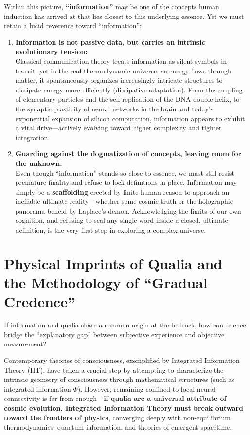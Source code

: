 \documentclass[11pt,a4paper]{article}
\begin{document}
Within this picture, \textbf{``information''} may be one of the concepts human induction has arrived at that lies closest to this underlying essence. Yet we must retain a lucid reverence toward ``information'':

\begin{enumerate}[leftmargin=1.8em, itemsep=0.5em]
    \item \textbf{Information is not passive data, but carries an intrinsic evolutionary tension:}\\
    Classical communication theory treats information as silent symbols in transit, yet in the real thermodynamic universe, as energy flows through matter, it spontaneously organizes increasingly intricate structures to dissipate energy more efficiently (dissipative adaptation). From the coupling of elementary particles and the self-replication of the DNA double helix, to the synaptic plasticity of neural networks in the brain and today's exponential expansion of silicon computation, information appears to exhibit a vital drive---actively evolving toward higher complexity and tighter integration.

    \item \textbf{Guarding against the dogmatization of concepts, leaving room for the unknown:}\\
    Even though ``information'' stands so close to essence, we must still resist premature finality and refuse to lock definitions in place. Information may simply be a \textbf{scaffolding} erected by finite human reason to approach an ineffable ultimate reality---whether some cosmic truth or the holographic panorama beheld by Laplace's demon. Acknowledging the limits of our own cognition, and refusing to seal any single word inside a closed, ultimate definition, is the very first step in exploring a complex universe.
\end{enumerate}

\section{Physical Imprints of Qualia and the Methodology of ``Gradual Credence''}

If information and qualia share a common origin at the bedrock, how can science bridge the ``explanatory gap'' between subjective experience and objective measurement?

Contemporary theories of consciousness, exemplified by Integrated Information Theory (IIT), have taken a crucial step by attempting to characterize the intrinsic geometry of consciousness through mathematical structures (such as integrated information $\Phi$). However, remaining confined to local neural connectivity is far from enough---\textbf{if qualia are a universal attribute of cosmic evolution, Integrated Information Theory must break outward toward the frontiers of physics}, converging deeply with non-equilibrium thermodynamics, quantum information, and theories of emergent spacetime.
\end{document}
